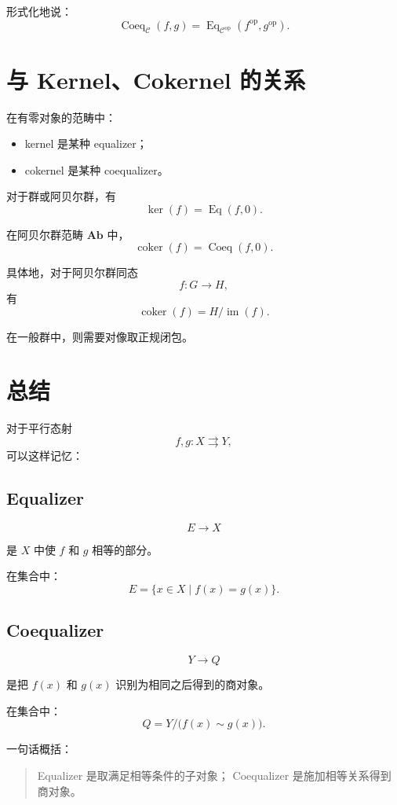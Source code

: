 \documentclass[UTF8, a4paper, 12pt]{ctexart}
\newcommand{\Ab}{\mathbf{Ab}}
\newcommand{\op}{\mathrm{op}}
\begin{document}
形式化地说：
\[
\operatorname{Coeq}_{\mathcal{C}}(f,g)
=
\operatorname{Eq}_{\mathcal{C}^{\op}}(f^{\op},g^{\op}).
\]

\section{与 Kernel、Cokernel 的关系}

在有零对象的范畴中：

\begin{itemize}
    \item kernel 是某种 equalizer；
    \item cokernel 是某种 coequalizer。
\end{itemize}

对于群或阿贝尔群，有
\[
\ker(f)=\operatorname{Eq}(f,0).
\]

在阿贝尔群范畴 \(\Ab\) 中，
\[
\operatorname{coker}(f)=\operatorname{Coeq}(f,0).
\]

具体地，对于阿贝尔群同态
\[
f\colon G\to H,
\]
有
\[
\operatorname{coker}(f)
=
H/\operatorname{im}(f).
\]

在一般群中，则需要对像取正规闭包。

\section{总结}

对于平行态射
\[
f,g\colon X\rightrightarrows Y,
\]
可以这样记忆：

\subsection*{Equalizer}

\[
E\to X
\]

是 \(X\) 中使 \(f\) 和 \(g\) 相等的部分。

在集合中：
\[
E=\{x\in X\mid f(x)=g(x)\}.
\]

\subsection*{Coequalizer}

\[
Y\to Q
\]

是把 \(f(x)\) 和 \(g(x)\) 识别为相同之后得到的商对象。

在集合中：
\[
Q=Y/\bigl(f(x)\sim g(x)\bigr).
\]

一句话概括：

\begin{quote}
Equalizer 是取满足相等条件的子对象；
Coequalizer 是施加相等关系得到商对象。
\end{quote}
\end{document}
